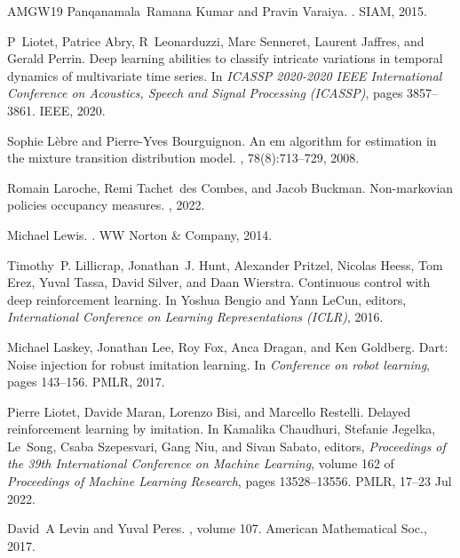 \begin{thebibliography}{AMGW{\etalchar{+}}19}
Panqanamala~Ramana Kumar and Pravin Varaiya.
.
\newblock SIAM, 2015.

P~Liotet, Patrice Abry, R~Leonarduzzi, Marc Senneret, Laurent Jaffres, and Gerald Perrin.
\newblock Deep learning abilities to classify intricate variations in temporal dynamics of multivariate time series.
\newblock In {\em ICASSP 2020-2020 IEEE International Conference on Acoustics, Speech and Signal Processing (ICASSP)}, pages 3857--3861. IEEE, 2020.

Sophie L{\`e}bre and Pierre-Yves Bourguignon.
\newblock An em algorithm for estimation in the mixture transition distribution model.
, 78(8):713--729, 2008.

Romain Laroche, Remi Tachet~des Combes, and Jacob Buckman.
\newblock Non-markovian policies occupancy measures.
, 2022.

Michael Lewis.
.
\newblock WW Norton \& Company, 2014.

Timothy~P. Lillicrap, Jonathan~J. Hunt, Alexander Pritzel, Nicolas Heess, Tom Erez, Yuval Tassa, David Silver, and Daan Wierstra.
\newblock Continuous control with deep reinforcement learning.
\newblock In Yoshua Bengio and Yann LeCun, editors, {\em International Conference on Learning Representations (ICLR)}, 2016.

Michael Laskey, Jonathan Lee, Roy Fox, Anca Dragan, and Ken Goldberg.
\newblock Dart: Noise injection for robust imitation learning.
\newblock In {\em Conference on robot learning}, pages 143--156. PMLR, 2017.

Pierre Liotet, Davide Maran, Lorenzo Bisi, and Marcello Restelli.
\newblock Delayed reinforcement learning by imitation.
\newblock In Kamalika Chaudhuri, Stefanie Jegelka, Le~Song, Csaba Szepesvari, Gang Niu, and Sivan Sabato, editors, {\em Proceedings of the 39th International Conference on Machine Learning}, volume 162 of {\em Proceedings of Machine Learning Research}, pages 13528--13556. PMLR, 17--23 Jul 2022.

David~A Levin and Yuval Peres.
, volume 107.
\newblock American Mathematical Soc., 2017.


\end{thebibliography}
